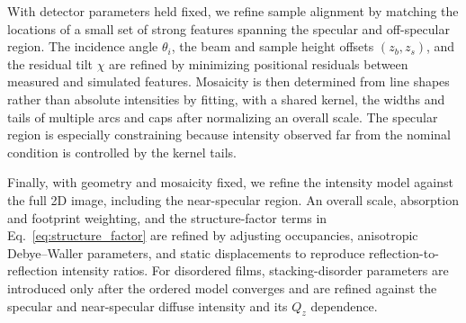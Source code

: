 With detector parameters held fixed, we refine sample alignment by matching the locations of a small set of strong features spanning the specular and off-specular region. The incidence angle $\theta_i$, the beam and sample height offsets $(z_b,z_s)$, and the residual tilt $\chi$ are refined by minimizing positional residuals between measured and simulated features. Mosaicity is then determined from line shapes rather than absolute intensities by fitting, with a shared kernel, the widths and tails of multiple arcs and caps after normalizing an overall scale. The specular region is especially constraining because intensity observed far from the nominal condition is controlled by the kernel tails.

Finally, with geometry and mosaicity fixed, we refine the intensity model against the full 2D image, including the near-specular region. An overall scale, absorption and footprint weighting, and the structure-factor terms in Eq.~\eqref{eq:structure_factor} are refined by adjusting occupancies, anisotropic Debye--Waller parameters, and static displacements to reproduce reflection-to-reflection intensity ratios. For disordered films, stacking-disorder parameters are introduced only after the ordered model converges and are refined against the specular and near-specular diffuse intensity and its $Q_z$ dependence.


